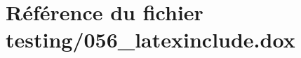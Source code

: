 \hypertarget{056__latexinclude_8dox}{}\section{Référence du fichier testing/056\+\_\+latexinclude.dox}
\label{056__latexinclude_8dox}
